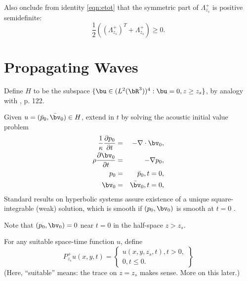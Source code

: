 Also onclude from identity \ref{eqn:etot} that the symmetric part of $\Lambda^+_{z_s}$ is positive semidefinite:
\begin{equation}
  \label{eqn:lamsd}
  \frac{1}{2}((\Lambda_{z_s}^+)^T + \Lambda^+_{z_s}) \ge 0.
\end{equation}


\section{Propagating Waves}
Define $H$ to be the subspace $\{\bu \in (L^2(\bR^3))^4: \bu=0,z\ge
z_s\}$, by analogy with \cite{Lax:PDENotes}, p. 122.

Given $u=(\bar{p}_0,\bar{\bv}_0) \in H$, extend in $t$ by solving the
acoustic initial value problem
\begin{eqnarray}
\label{eqn:awe0}
  \frac{1}{\kappa}\frac{\partial p_0}{\partial t} & = & - \nabla \cdot \bv_0, \nonumber \\
  \rho\frac{\partial \bv_0}{\partial t} & = & - \nabla p_0,\nonumber \\
  p_0 & =& \bar{p}_0, t=0,\nonumber\\ 
  \bv_0 & = & \bar{\bv}_0, t=0,\nonumber\\
\end{eqnarray}
Standard results on hyperbolic systems assure existence of a unique
square-integrable (weak) solution, which is smooth if $(p_0,\bv_0)$ is
smooth at $t=0$ \cite[]{CourHil:62,LaxPDENotes}.

Note that $(p_0,\bv_0)=0$ near $t=0$ in the half-space $z>z_s$.

For any suitable space-time function $u$, define
\begin{equation}
  \label{eqn:postrace}
  P^+_{z_s}u(x,y,t) =
  \left\{
    \begin{array}{c}
      u(x,y,z_s,t), t>0,\\
      0, t\le 0.
    \end{array}
  \right\}
\end{equation}
(Here, ``suitable'' means: the trace on $z=z_s$ makes sense. More on
this later.)


